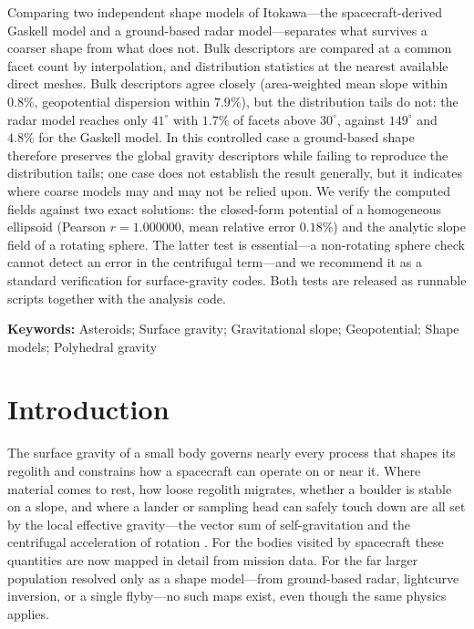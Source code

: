 {Comparing two independent shape models of Itokawa---the spacecraft-derived
Gaskell model and a ground-based radar model---separates what survives a coarser
shape from what does not. Bulk descriptors are compared at a common facet count
by interpolation, and distribution statistics at the nearest available direct
meshes. Bulk descriptors agree
closely (area-weighted mean slope within $0.8\%$, geopotential dispersion within
$7.9\%$), but the distribution tails do not: the radar model reaches only
$41^{\circ}$ with $1.7\%$ of facets above $30^{\circ}$, against $149^{\circ}$
and $4.8\%$ for the Gaskell model. In this controlled case a ground-based shape
therefore preserves the global gravity descriptors while failing to reproduce
the distribution tails; one case does not establish the result generally, but it
indicates where coarse models may and may not be relied upon. We verify the computed fields against two exact solutions: the
closed-form potential of a homogeneous ellipsoid (Pearson $r=1.000000$, mean
relative error $0.18\%$) and the analytic slope field of a rotating sphere.
The latter test is essential---a non-rotating sphere check cannot detect an
error in the centrifugal term---and we recommend it as a standard verification
for surface-gravity codes. Both tests are released as runnable scripts together
with the analysis code.
}

\medskip
\noindent\textbf{Keywords:} Asteroids; Surface gravity; Gravitational slope;
Geopotential; Shape models; Polyhedral gravity

\section{Introduction}
\label{sec:intro}

The surface gravity of a small body governs nearly every process that shapes
its regolith and constrains how a spacecraft can operate on or near it. Where
material comes to rest, how loose regolith migrates, whether a boulder is
stable on a slope, and where a lander or sampling head can safely touch down
are all set by the local effective gravity---the vector sum of self-gravitation
and the centrifugal acceleration of rotation
\citep{scheeres2016,scheeres2019}. For the bodies visited by spacecraft these
quantities are now mapped in detail from mission data. For the far larger
population resolved only as a shape model---from ground-based radar, lightcurve
inversion, or a single flyby---no such maps exist, even though the same physics
applies.

